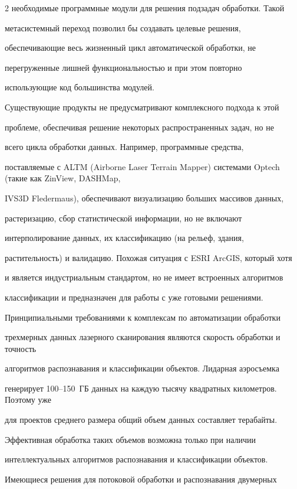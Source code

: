 \begin{multicols}{2}
необходимые программные модули для решения подзадач обработки. Такой 

метасистемный переход позволил бы создавать целевые решения, 

обеспечивающие весь жизненный цикл автоматической обработки, не 

перегруженные лишней функциональностью и при этом повторно 

использующие код большинства модулей.

   

   Существующие продукты не предусматривают комплексного подхода к этой 

проблеме, обеспечивая решение некоторых распространенных задач, но не 

всего цикла обработки данных. Например, программные средства, 

поставляемые с ALTM (Airborne Laser Terrain Mapper) сис\-те\-ма\-ми Optech (такие как ZinView, DASHMap, 

IVS3D Fledermaus), обеспечивают визуализацию больших массивов данных, 

растеризацию, сбор статистической информации, но не включают 

интерполирование данных, их классификацию (на рель\-еф, здания, 

растительность) и валидацию. Похожая ситуация с ESRI ArcGIS, который хотя 

и является индустриальным стандартом, но не имеет встроенных алгоритмов 

классификации и предназначен для работы с уже готовыми решениями.

   

   Принципиальными требованиями к комплексам по автоматизации обработки 

трехмерных данных лазерного сканирования являются скорость обработки и точность 

алгоритмов распознавания и классификации объектов. Лидарная аэросъемка 

генерирует 100--150~ГБ данных на каждую тысячу квад\-рат\-ных километров. Поэтому уже 

для проектов среднего размера общий объем данных составляет терабайты. 

Эффективная обработка таких объемов возможна только при наличии 

интеллектуальных алгоритмов распознавания и классификации объектов.

   

   Имеющиеся решения для потоковой обработки и распознавания двумерных 


\end{multicols}
